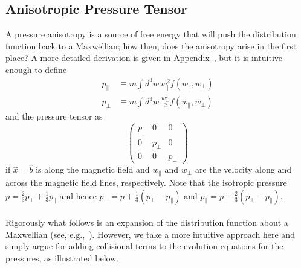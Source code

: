 \subsection{Anisotropic Pressure Tensor}\label{ssec:anisopres}
A pressure anisotropy is a source of free energy that will push the distribution function back to a Maxwellian; how then, does the anisotropy arise in the first place? A more detailed derivation is given in Appendix~\cite{ssec:anisopres}, but it is intuitive enough to define 
\begin{align}
  p_\parallel&\equiv m\int d^3w~w_\parallel^2f(w_\parallel,w_\perp)\\
  p_\perp &\equiv m\int d^3w~\frac{w_\perp^2}2f(w_\parallel,w_\perp)
\end{align}
and the pressure tensor as
\begin{equation}
  \begin{pmatrix}
  p_\parallel & 0 & 0\\
  0 & p_\perp & 0\\
  0 & 0 & p_\perp
  \end{pmatrix}
\end{equation}
if $\hat x=\hat b$ is along the magnetic field and $w_\parallel$ and $w_\perp$ are the velocity along and across the magnetic field lines, respectively. Note that the isotropic pressure $p=\frac23p_\perp+\frac13p_\parallel$ and hence $p_\perp=p+\frac13(p_\perp-p_\parallel)$ and $p_\parallel=p-\frac23(p_\perp-p_\parallel)$. \\
\\
Rigorously what follows is an expansion of the distribution function about a Maxwellian (see, e.g.,~\cite{Negulescu2016}). However, we take a more intuitive approach here and simply argue for adding collisional terms to the evolution equations for the pressures, as illustrated below. 

